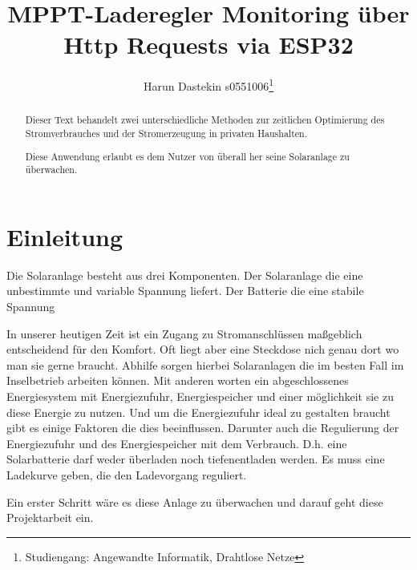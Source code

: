 \documentclass [ngerman]{mucproc}
\begin{document}
	\title{MPPT-Laderegler Monitoring über Http Requests via ESP32 }%
	\author{Harun Dastekin s0551006\thanks[HTW Berlin]{Studiengang: Angewandte Informatik, Drahtlose Netze}}
	
\maketitle

\begin{abstract}
Dieser Text behandelt zwei unterschiedliche Methoden zur zeitlichen Optimierung des Stromverbrauches und der Stromerzeugung in privaten Haushalten.

Diese Anwendung erlaubt es dem Nutzer von überall her seine Solaranlage zu überwachen.
\end{abstract}	
	
\section{Einleitung}
	Die Solaranlage besteht aus drei Komponenten. Der Solaranlage die eine unbestimmte und variable Spannung liefert. Der Batterie die eine stabile Spannung 

	In unserer heutigen Zeit ist ein Zugang zu Stromanschlüssen maßgeblich entscheidend für den Komfort. Oft liegt aber eine Steckdose nich genau dort wo man sie gerne braucht. Abhilfe sorgen hierbei Solaranlagen die im besten Fall im Inselbetrieb arbeiten können. Mit anderen worten ein abgeschlossenes Energiesystem mit Energiezufuhr, Energiespeicher und einer möglichkeit sie zu diese Energie zu nutzen. Und um die Energiezufuhr ideal zu gestalten braucht gibt es einige Faktoren die dies beeinflussen. Darunter auch die Regulierung der Energiezufuhr und des Energiespeicher mit dem Verbrauch. D.h. eine Solarbatterie darf weder überladen noch tiefenentladen werden. Es muss eine Ladekurve geben, die den Ladevorgang reguliert. 
	
Ein erster Schritt wäre es diese Anlage zu überwachen und darauf geht diese Projektarbeit ein.

\newpage
\end{document}
